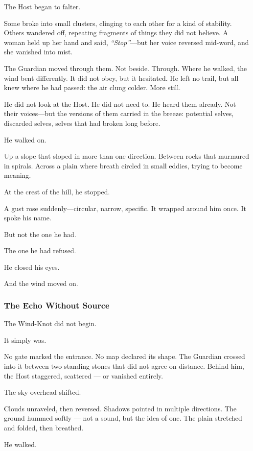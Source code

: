 \documentclass[12pt]{article}
\begin{document}
The Host began to falter.

Some broke into small clusters, clinging to each other for a kind of stability. Others wandered off, repeating fragments of things they did not believe. A woman held up her hand and said, \textit{``Stop''}—but her voice reversed mid-word, and she vanished into mist.

The Guardian moved through them. Not beside. Through. Where he walked, the wind bent differently. It did not obey, but it hesitated. He left no trail, but all knew where he had passed: the air clung colder. More still.

He did not look at the Host. He did not need to. He heard them already. Not their voices—but the versions of them carried in the breeze: potential selves, discarded selves, selves that had broken long before.

He walked on.

Up a slope that sloped in more than one direction. Between rocks that murmured in spirals. Across a plain where breath circled in small eddies, trying to become meaning.

At the crest of the hill, he stopped.

A gust rose suddenly—circular, narrow, specific. It wrapped around him once. It spoke his name.

But not the one he had.

The one he had refused.

He closed his eyes.

And the wind moved on.

\dotfill

\subsubsection*{The Echo Without Source}

The Wind-Knot did not begin.

It simply was.

No gate marked the entrance. No map declared its shape. The Guardian crossed into it between two standing stones that did not agree on distance. Behind him, the Host staggered, scattered — or vanished entirely.

The sky overhead shifted.

Clouds unraveled, then reversed. Shadows pointed in multiple directions. The ground hummed softly — not a sound, but the idea of one. The plain stretched and folded, then breathed.

He walked.
\end{document}
